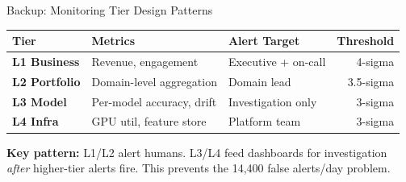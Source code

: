 \documentclass[aspectratio=169, 12pt]{beamer}
\begin{document}
\begin{frame}{Backup: Monitoring Tier Design Patterns}

\footnotesize
\renewcommand{\arraystretch}{1.15}
\begin{tabular}{@{}lllr@{}}
  \toprule
  \textbf{Tier} & \textbf{Metrics} & \textbf{Alert Target} & \textbf{Threshold} \\
  \midrule
  \textbf{L1 Business}    & Revenue, engagement      & Executive + on-call & 4-sigma \\
  \textbf{L2 Portfolio}   & Domain-level aggregation  & Domain lead         & 3.5-sigma \\
  \textbf{L3 Model}       & Per-model accuracy, drift & Investigation only  & 3-sigma \\
  \textbf{L4 Infra}       & GPU util, feature store   & Platform team       & 3-sigma \\
  \bottomrule
\end{tabular}

\vspace{0.15cm}
\textbf{Key pattern:} L1/L2 alert humans. L3/L4 feed dashboards for investigation \emph{after} higher-tier alerts fire. This prevents the 14,400 false alerts/day problem.

\end{frame}
\end{document}
